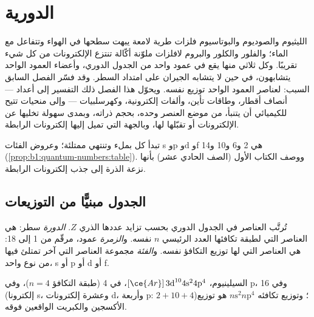 \chapter{الدورية}\label{ch:b1:periodicity}

الليثيوم والصوديوم والبوتاسيوم فلزات طرية لامعة يبهت سطحها في الهواء
وتتفاعل مع الماء؛ والفلور والكلور والبروم لافلزات ملوّنة أكّالة تنتزع
الإلكترونات من كل شيء تقريبًا. وكل ثلاثي منها يقع في عمود واحد من الجدول
الدوري، وأعضاء العمود الواحد يتشابهون، في حين لا يتشابه الجيران على
امتداد السطر. وقد فسّر الفصل السابق السبب: لعناصر العمود الواحد توزيع
 نفسه. ويحوّل هذا الفصل ذلك التفسير إلى أعداد ---
أنصاف أقطار، وطاقات تأين، وألفات إلكترونية، وكهرسلبيات --- وإلى منحيات
تتيح للكيميائي أن يتنبأ، من موضع العنصر وحده، بحجم ذراته، وبمدى سهولة
تخليها عن الإلكترونات أو تقبّلها لها، وبالجهة التي تميل إليها إلكترونات
الرابطة.

\begin{recall}
تبدأ كل  بملء   وتنتهي   ممتلئة؛ وعروض
الفئات s وp وd وf هي 2 و6 و10
و14 (\cref{prop:b1:quantum-numbers:table}). ووصف الكتاب الأول (الصف
الحادي عشر)  بأنها نزعة الذرة إلى جذب
إلكترونات الرابطة.
\end{recall}

\section{الجدول مبنيًّا من التوزيعات}

\begin{definition}\label{def:b1:periodicity:table}
تُرتَّب العناصر في الجدول الدوري بحسب تزايد عددها
الذري $Z$. \emph{الدورة} سطر: هي العناصر التي لطبقة
تكافئها العدد الرئيسي $n$ نفسه. و\emph{الزمرة} عمود،
مرقّم من 1 إلى 18: هي العناصر التي لها توزيع التكافؤ نفسه.
و\emph{الفئة} مجموعة العناصر التي آخر  تمتلئ فيها
من نوع واحد، s أو p أو d أو f.
\end{definition}

\begin{example}\label{ex:b1:periodicity:position}
السيلينيوم، $[\ce{Ar}]\,3\text{d}^{10} 4\text{s}^2 4\text{p}^4$، في
 4 (طبقة التكافؤ $n = 4$)، وفي  p، وفي  16 (إلكترونا s،
وعشرة إلكترونات d، وأربعة p: $2 + 10 + 4$)؛ وتوزيع تكافئه
$n\text{s}^2 n\text{p}^4$ هو توزيع الأكسجين والكبريت الواقعين فوقه.
\end{example}

